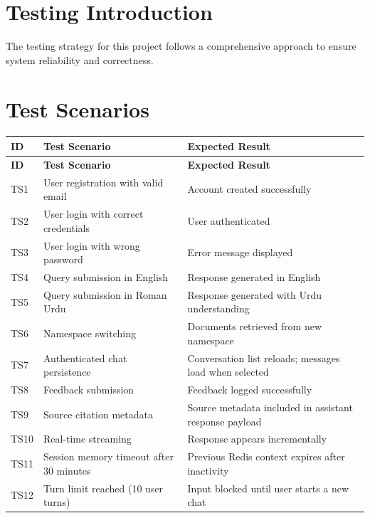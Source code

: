 \documentclass[12pt,a4paper]{book}
\numberwithin{table}{chapter}
\numberwithin{figure}{chapter}
\numberwithin{equation}{chapter}
\begin{document}
\section{Testing Introduction}

The testing strategy for this project follows a comprehensive approach to ensure system reliability and correctness.

\section{Test Scenarios}

\begin{longtable}{|p{0.5in}|p{3in}|p{2in}|}
\hline
\textbf{ID} & \textbf{Test Scenario} & \textbf{Expected Result}\\
\hline
\endfirsthead
\hline
\textbf{ID} & \textbf{Test Scenario} & \textbf{Expected Result}\\
\hline
\endhead
\hline
TS1 & User registration with valid email & Account created successfully\\
\hline
TS2 & User login with correct credentials & User authenticated\\
\hline
TS3 & User login with wrong password & Error message displayed\\
\hline
TS4 & Query submission in English & Response generated in English\\
\hline
TS5 & Query submission in Roman Urdu & Response generated with Urdu understanding\\
\hline
TS6 & Namespace switching & Documents retrieved from new namespace\\
\hline
TS7 & Authenticated chat persistence & Conversation list reloads; messages load when selected\\
\hline
TS8 & Feedback submission & Feedback logged successfully\\
\hline
TS9 & Source citation metadata & Source metadata included in assistant response payload\\
\hline
TS10 & Real-time streaming & Response appears incrementally\\
\hline
TS11 & Session memory timeout after 30 minutes & Previous Redis context expires after inactivity\\
\hline
TS12 & Turn limit reached (10 user turns) & Input blocked until user starts a new chat\\
\hline
\end{longtable}
\end{document}
